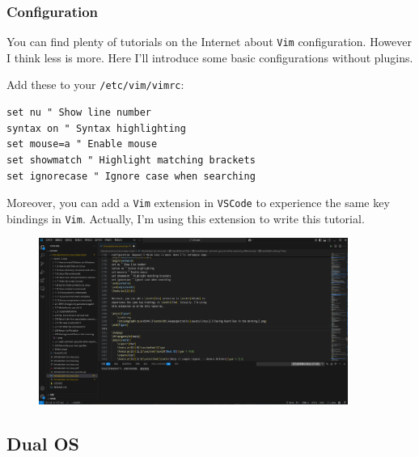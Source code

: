 \documentclass[12pt]{ctexart}
\begin{document}
\subsubsection{\textbf{Configuration}}

You can find plenty of tutorials on the Internet about \texttt{Vim}
configuration. However I think less is more. Here I'll introduce some
basic configurations without plugins.

Add these to your \texttt{/etc/vim/vimrc}:

\fontsize{10}{12}
\begin{adjustwidth}{2em}{0pt}
\begin{verbatim}
set nu " Show line number
syntax on " Syntax highlighting
set mouse=a " Enable mouse
set showmatch " Highlight matching brackets
set ignorecase " Ignore case when searching
\end{verbatim}
\end{adjustwidth}
\fontsize{12}{14}

Moreover, you can add a \texttt{Vim} extension in \texttt{VSCode} to
experience the same key bindings in \texttt{Vim}. Actually, I'm using
this extension to write this tutorial.

\begin{figure}
    \centering
    \includegraphics[width=0.9\textwidth,keepaspectratio]{assets/Linux/2.9 Having heard Dao in the morning/2.png}
\end{figure}

\newpage
\thispagestyle{empty}
\begin{center}
    \vspace*{96pt}
    \fontsize{60}{60}\par
    \fontsize{26}{31.2}\section{\textbf{Dual OS}}\par %
    \vspace{25pt}
    \fontsize{18}{21.6}\par %
    \vfill
\end{center}
\end{document}
